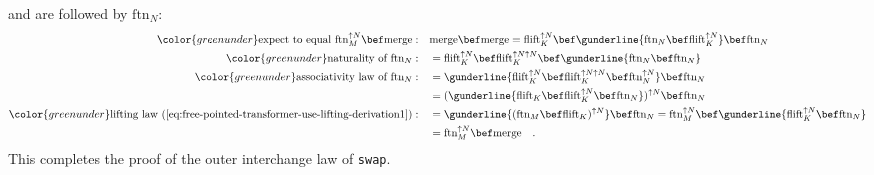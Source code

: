 and are followed by $\text{ftn}_{N}$:
\begin{align*}
{\color{greenunder}\text{expect to equal }\text{ftn}_{M}^{\uparrow N}\bef\text{merge}:}\quad & \text{merge}\bef\text{merge}=\text{flift}_{K}^{\uparrow N}\bef\gunderline{\text{ftn}_{N}\bef\text{flift}_{K}^{\uparrow N}}\bef\text{ftn}_{N}\\
{\color{greenunder}\text{naturality of }\text{ftn}_{N}:}\quad & =\text{flift}_{K}^{\uparrow N}\bef\text{flift}_{K}^{\uparrow N\uparrow N}\bef\gunderline{\text{ftn}_{N}\bef\text{ftn}_{N}}\\
{\color{greenunder}\text{associativity law of }\text{ftn}_{N}:}\quad & =\gunderline{\text{flift}_{K}^{\uparrow N}\bef\text{flift}_{K}^{\uparrow N\uparrow N}\bef\text{ftn}_{N}^{\uparrow N}}\bef\text{ftn}_{N}\\
 & =(\gunderline{\text{flift}_{K}\bef\text{flift}_{K}^{\uparrow N}\bef\text{ftn}_{N}})^{\uparrow N}\bef\text{ftn}_{N}\\
{\color{greenunder}\text{lifting law~(\ref{eq:free-pointed-transformer-use-lifting-derivation1})}:}\quad & =\gunderline{(\text{ftn}_{M}\bef\text{flift}_{K})^{\uparrow N}}\bef\text{ftn}_{N}=\text{ftn}_{M}^{\uparrow N}\bef\gunderline{\text{flift}_{K}^{\uparrow N}\bef\text{ftn}_{N}}\\
 & =\text{ftn}_{M}^{\uparrow N}\bef\text{merge}\quad.
\end{align*}
This completes the proof of the outer interchange law of \lstinline!swap!.

